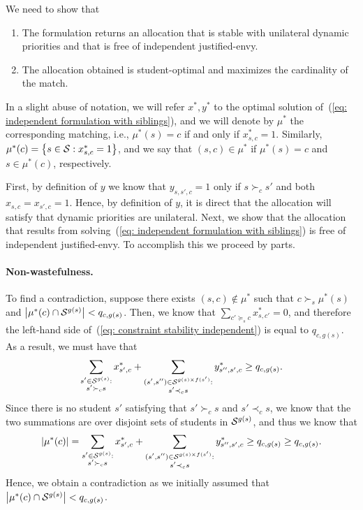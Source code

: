                 We need to show that
                \begin{enumerate}
                  \item The formulation returns an allocation that is stable with unilateral dynamic priorities and that is free of independent justified-envy.
                  \item The allocation obtained is student-optimal and maximizes the cardinality of the match.
                \end{enumerate}

                In a slight abuse of notation, we will refer \(x^{*}, y^{*}\) to the optimal solution of~(\ref{eq: independent formulation with siblings}), and we will denote by \(\mu^{*}\) the corresponding matching, i.e., \(\mu^*(s) = c\) if and only if \(x^*_{s,c} = 1\).
                Similarly, \(\mu^*(c) = \left\{s\in \mathcal{S} : x^*_{s,c} = 1\right\}\), and we say that \((s,c) \in \mu^*\) if \(\mu^*(s) = c\) and \(s\in \mu^*(c)\), respectively.

                First, by definition of \(y\) we know that \(y_{s,s',c} = 1\) only if \(s\succ_c s'\) and both \(x_{s,c} = x_{s',c} = 1\). Hence, by definition of \(y\), it is direct that the allocation will satisfy that dynamic priorities are unilateral. Next, we show that the allocation that results from solving~(\ref{eq: independent formulation with siblings}) is free of independent justified-envy. To accomplish this we proceed by parts.

                \paragraph{Non-wastefulness.} To find a contradiction, suppose there exists \((s,c) \notin \mu^*\) such that \(c \succ_s \mu^*(s)\) and \(\left|\mu^*(c) \cap \mathcal{S}^{g(s)}\right| < q_{c,g(s)}\). Then, we know that
                \(\sum_{c'\succeq_s c} x^*_{s,c'} = 0\), and therefore the left-hand side of~(\ref{eq: constraint stability independent}) is equal to \(q_{c,g(s)}\). As a result, we must have that
                \[\sum_{\substack{s'\in \mathcal{S}^{g(s)}:\\ s'\succ_c s}} x^*_{s', c} + \sum_{\substack{(s',s'') \in \mathcal{S}^{g(s)\times f(s')} :\\ s' \prec_c s }}  y^*_{s'',s',c} \geq q_{c,g(s)}.\]
                Since there is no student \(s'\) satisfying that \(s' \succ_c s\) and \(s' \prec_c s\), we know that the two summations are over disjoint sets of students in \(\mathcal{S}^{g(s)}\), and thus we know that
                \[\left|\mu^*(c)\right| = \sum_{\substack{s'\in \mathcal{S}^{g(s)}:\\ s'\succ_c s}} x^*_{s', c} + \sum_{\substack{(s',s'') \in \mathcal{S}^{g(s)\times f(s')} :\\ s' \prec_c s }}  y^*_{s'',s',c} \geq q_{c,g(s)} \geq q_{c,g(s)}.\]
                Hence, we obtain a contradiction as we initially assumed that  \(\left|\mu^*(c) \cap \mathcal{S}^{g(s)}\right| < q_{c,g(s)}\).
